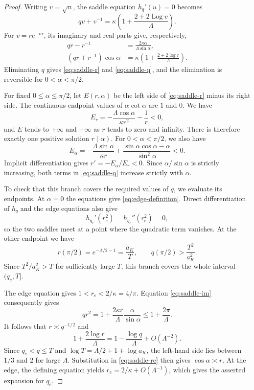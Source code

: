 \documentclass[11pt,reqno]{amsart}
\numberwithin{equation}{section}
\DeclareMathOperator{\Log}{Log}
\begin{document}
\begin{proof}
Writing $v=\sqrt u$, the saddle equation $h_q'(u)=0$ becomes
\[
 qv+v^{-1}=\kappa\left(1+\frac{2+2\Log v}{\Lambda}\right).
\]
For $v=re^{-i\alpha}$, its imaginary and real parts give, respectively,
\begin{align}
 qr-r^{-1}&=\frac{2\kappa\alpha}{\Lambda\sin\alpha},
                       \label{eq:saddle-im}\\
 (qr+r^{-1})\cos\alpha
    &=\kappa\left(1+\frac{2+2\log r}{\Lambda}\right).
                       \label{eq:saddle-re}
\end{align}
Eliminating $q$ gives \eqref{eq:saddle-r} and
\eqref{eq:saddle-q}, and the elimination is reversible for
$0<\alpha<\pi/2$.

For fixed $0\le\alpha\le\pi/2$, let $E(r,\alpha)$ be the left side
of \eqref{eq:saddle-r} minus its right side. The continuous endpoint
values of $\alpha\cot\alpha$ are $1$ and $0$. We have
\[
 E_r=-\frac{\Lambda\cos\alpha}{\kappa r^2}-\frac1r<0,
\]
and $E$ tends to $+\infty$ and $-\infty$ as $r$ tends to zero
and infinity. There is therefore exactly one positive solution
$r(\alpha)$. For $0<\alpha<\pi/2$, we also have
\[
 E_\alpha=-\frac{\Lambda\sin\alpha}{\kappa r}
          +\frac{\sin\alpha\cos\alpha-\alpha}{\sin^2\alpha}<0.
\]
Implicit differentiation gives $r'=-E_\alpha/E_r<0$.
Since $\alpha/\sin\alpha$ is strictly increasing, both terms
in \eqref{eq:saddle-q} increase strictly with $\alpha$.

To check that this branch covers the required values of $q$, we
evaluate its endpoints. At $\alpha=0$ the equations give
\eqref{eq:edge-definition}. Direct differentiation of $h_q$ and
the edge equations also give
\[
 h_{q_e}'(r_e^2)=h_{q_e}''(r_e^2)=0,
\]
so the two saddles meet at a point where the quadratic term
vanishes. At the other endpoint we have
\[
 r(\pi/2)=e^{-\Lambda/2-1}=\frac{a_K}{T},
 \qquad q(\pi/2)>\frac{T^2}{a_K^2}.
\]
Since $T^2/a_K^2>T$ for sufficiently large $T$, this branch covers the
whole interval $(q_e,T]$.

The edge equation gives $1<r_e<2/\kappa=4/\pi$. Equation
\eqref{eq:saddle-im} consequently gives
\[
 qr^2=1+\frac{2\kappa r}{\Lambda}\frac{\alpha}{\sin\alpha}
 \le1+\frac{2\pi}{\Lambda}.
\]
It follows that $r\asymp q^{-1/2}$ and
\begin{equation}\label{eq:log-r-range}
 1+\frac{2\log r}{\Lambda}
   =1-\frac{\log q}{\Lambda}+O(\Lambda^{-2}).
\end{equation}
Since $q_e<q\le T$ and $\log T=\Lambda/2+1+\log a_K$, the
left-hand side lies between $1/3$ and $2$ for large $\Lambda$.
Substitution in \eqref{eq:saddle-re} then gives
$\cos\alpha\asymp r$. At the edge, the defining equation yields
$r_e=2/\kappa+O(\Lambda^{-1})$, which gives the asserted expansion
for $q_e$.


\end{proof}
\end{document}
